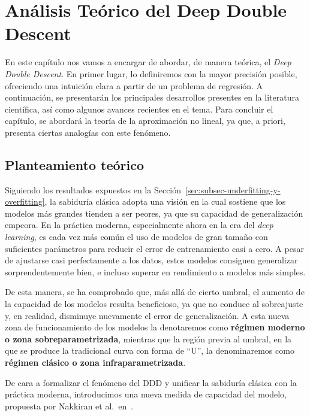 
\chapter{Análisis Teórico del Deep Double Descent}\label{ch:analisis-teorico-ddd}

En este capítulo nos vamos a encargar de abordar, de manera teórica, el \textit{Deep Double Descent}. En primer lugar, lo definiremos con la mayor precisión posible, ofreciendo una intuición clara a partir de un problema de regresión. A continuación, se presentarán los principales desarrollos presentes en la literatura científica, así como algunos avances recientes en el tema. Para concluir el capítulo, se abordará la teoría de la aproximación no lineal, ya que, a priori, presenta ciertas analogías con este fenómeno.

\section{Planteamiento teórico}\label{sec:planteamiento-teorico}

Siguiendo los resultados expuestos en la Sección~\ref{sec:subsec-underfitting-y-overfitting}, la sabiduría clásica adopta una visión en la cual sostiene que los modelos más grandes tienden a ser peores, ya que su capacidad de generalización empeora. En la práctica moderna, especialmente ahora en la era del \textit{deep learning}, es cada vez más común el uso de modelos de gran tamaño con suficientes parámetros para reducir el error de entrenamiento casi a cero. A pesar de ajustarse casi perfectamente a los datos, estos modelos consiguen generalizar sorprendentemente bien, e incluso superar en rendimiento a modelos más simples.

De esta manera, se ha comprobado que, más allá de cierto umbral, el aumento de la capacidad de los modelos resulta beneficioso, ya que no conduce al sobreajuste y, en realidad, disminuye nuevamente el error de generalización. A esta nueva zona de funcionamiento de los modelos la denotaremos como \textbf{régimen moderno o zona sobreparametrizada}, mientras que la región previa al umbral, en la que se produce la tradicional curva con forma de ``U'', la denominaremos como \textbf{régimen clásico o zona infraparametrizada}.

De cara a formalizar el fenómeno del DDD y unificar la sabiduría clásica con la práctica moderna, introducimos una nueva medida de capacidad del modelo, propuesta por Nakkiran et al.\ en~\cite{Nakkiran2019}.

